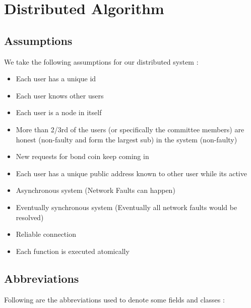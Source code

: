\section{Distributed Algorithm}

\subsection{Assumptions}

We take the following assumptions for our distributed system :

\begin{itemize}
    \item Each user has a unique id
    \item Each user knows other users
    \item Each user is a node in itself
    \item More than 2/3rd of the users (or specifically the committee members) are honest (non-faulty and form the largest sub) in the system (non-faulty)
    \item New requests for bond coin keep coming in
    \item Each user has a unique public address known to other user while its active
    \item Asynchronous system (Network Faults can happen)
    \item Eventually synchronous system (Eventually all network faults would be resolved)
    \item Reliable connection
    \item Each function is executed atomically
\end{itemize}

\subsection{Abbreviations}

Following are the abbreviations used to denote some fields and classes :

